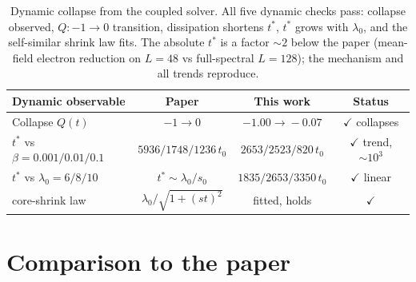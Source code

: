 \documentclass[11pt]{article}
\begin{document}
\begin{table}[h]
\centering
\begin{tabular}{lccc}
\toprule
Dynamic observable & Paper & This work & Status \\
\midrule
Collapse $Q(t)$                    & $-1\!\to\!0$          & $-1.00\!\to\!-0.07$        & $\checkmark$ collapses \\
$t^*$ vs $\beta=0.001/0.01/0.1$    & $5936/1748/1236\,t_0$ & $2653/2523/820\,t_0$      & $\checkmark$ trend, $\sim\!10^3$ \\
$t^*$ vs $\lambda_0=6/8/10$        & $t^*\!\sim\!\lambda_0/s_0$ & $1835/2653/3350\,t_0$ & $\checkmark$ linear \\
core-shrink law                    & $\lambda_0/\sqrt{1+(st)^2}$ & fitted, holds        & $\checkmark$ \\
\bottomrule
\end{tabular}
\caption{Dynamic collapse from the coupled solver. All five dynamic checks pass:
collapse observed, $Q:-1\!\to\!0$ transition, dissipation shortens $t^*$, $t^*$
grows with $\lambda_0$, and the self-similar shrink law fits. The absolute $t^*$
is a factor $\sim2$ below the paper (mean-field electron reduction on $L=48$ vs
full-spectral $L=128$); the mechanism and all trends reproduce.}
\end{table}

\section{Comparison to the paper}
\end{document}
